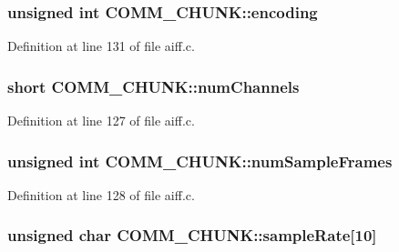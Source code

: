 \subsubsection[{\texorpdfstring{encoding}{encoding}}]{\setlength{\rightskip}{0pt plus 5cm}unsigned {\bf int} C\+O\+M\+M\+\_\+\+C\+H\+U\+N\+K\+::encoding}\hypertarget{struct_c_o_m_m___c_h_u_n_k_a460b061c5e34eb1c5c04585b4fadd6fe}{}\label{struct_c_o_m_m___c_h_u_n_k_a460b061c5e34eb1c5c04585b4fadd6fe}


Definition at line 131 of file aiff.\+c.

\subsubsection[{\texorpdfstring{num\+Channels}{numChannels}}]{\setlength{\rightskip}{0pt plus 5cm}short C\+O\+M\+M\+\_\+\+C\+H\+U\+N\+K\+::num\+Channels}\hypertarget{struct_c_o_m_m___c_h_u_n_k_a5a0e52025102d26f153200cdde0c1ed9}{}\label{struct_c_o_m_m___c_h_u_n_k_a5a0e52025102d26f153200cdde0c1ed9}


Definition at line 127 of file aiff.\+c.

\subsubsection[{\texorpdfstring{num\+Sample\+Frames}{numSampleFrames}}]{\setlength{\rightskip}{0pt plus 5cm}unsigned {\bf int} C\+O\+M\+M\+\_\+\+C\+H\+U\+N\+K\+::num\+Sample\+Frames}\hypertarget{struct_c_o_m_m___c_h_u_n_k_a23b9d6dd74ebf42bc9356ce8adf2640d}{}\label{struct_c_o_m_m___c_h_u_n_k_a23b9d6dd74ebf42bc9356ce8adf2640d}


Definition at line 128 of file aiff.\+c.

\subsubsection[{\texorpdfstring{sample\+Rate}{sampleRate}}]{\setlength{\rightskip}{0pt plus 5cm}unsigned char C\+O\+M\+M\+\_\+\+C\+H\+U\+N\+K\+::sample\+Rate\mbox{[}10\mbox{]}}\hypertarget{struct_c_o_m_m___c_h_u_n_k_aa1b3c130ca9cea336fcaec57c864072b}{}\label{struct_c_o_m_m___c_h_u_n_k_aa1b3c130ca9cea336fcaec57c864072b}


